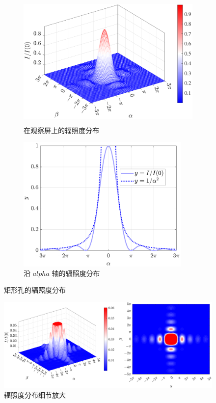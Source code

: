 \documentclass[UTF8]{report}
\theoremstyle{MyLineTheoremStyle} %
\theoremstyle{MyBlockTheoremStyle} %
\theoremstyle{MySubsubsectionStyle} %
\begin{document}
\begin{figure}[H]\centering
\begin{subfigure}[b]{0.5\columnwidth}\centering
    \includegraphics[height=190pt]{assets/4/4.3 矩形孔辐照度分布 1.pdf}
    \caption{在观察屏上的辐照度分布}
\end{subfigure}\hfill
\begin{subfigure}[b]{0.5\columnwidth}\centering
    \includegraphics[height=190pt]{assets/4/4.3 矩形孔衍射辐照度分布.pdf}
    \caption{沿 $alpha$ 轴的辐照度分布}
\end{subfigure}
\caption{矩形孔的辐照度分布}
\end{figure}

\begin{figure}[H]\centering
    \includegraphics[width=\columnwidth]{assets/4/4.3 矩形孔辐照度分布 3.pdf}
    \caption{辐照度分布细节放大}
\end{figure}
\end{document}
